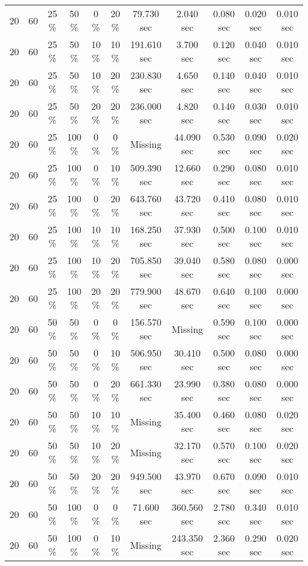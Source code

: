 \documentclass{article}
\begin{document}
\begin{longtable}[]{@{}ccccccccccc@{}}
20 & 60 & 25 \% & 50 \% & 0 \% & 20 \% & 79.730 sec & 2.040 sec & 0.080 sec & 0.020 sec & 0.010 sec \\
20 & 60 & 25 \% & 50 \% & 10 \% & 10 \% & 191.610 sec & 3.700 sec & 0.120 sec & 0.040 sec & 0.010 sec \\
20 & 60 & 25 \% & 50 \% & 10 \% & 20 \% & 230.830 sec & 4.650 sec & 0.140 sec & 0.040 sec & 0.010 sec \\
20 & 60 & 25 \% & 50 \% & 20 \% & 20 \% & 236.000 sec & 4.820 sec & 0.140 sec & 0.030 sec & 0.010 sec \\
20 & 60 & 25 \% & 100 \% & 0 \% & 0 \% & Missing & 44.090 sec & 0.530 sec & 0.090 sec & 0.020 sec \\
20 & 60 & 25 \% & 100 \% & 0 \% & 10 \% & 509.390 sec & 12.660 sec & 0.290 sec & 0.080 sec & 0.010 sec \\
20 & 60 & 25 \% & 100 \% & 0 \% & 20 \% & 643.760 sec & 43.720 sec & 0.410 sec & 0.080 sec & 0.010 sec \\
20 & 60 & 25 \% & 100 \% & 10 \% & 10 \% & 168.250 sec & 37.930 sec & 0.500 sec & 0.100 sec & 0.010 sec \\
20 & 60 & 25 \% & 100 \% & 10 \% & 20 \% & 705.850 sec & 39.040 sec & 0.580 sec & 0.080 sec & 0.000 sec \\
20 & 60 & 25 \% & 100 \% & 20 \% & 20 \% & 779.900 sec & 48.670 sec & 0.640 sec & 0.100 sec & 0.000 sec \\
20 & 60 & 50 \% & 50 \% & 0 \% & 0 \% & 156.570 sec & Missing & 0.590 sec & 0.100 sec & 0.000 sec \\
20 & 60 & 50 \% & 50 \% & 0 \% & 10 \% & 506.950 sec & 30.410 sec & 0.500 sec & 0.080 sec & 0.000 sec \\
20 & 60 & 50 \% & 50 \% & 0 \% & 20 \% & 661.330 sec & 23.990 sec & 0.380 sec & 0.080 sec & 0.000 sec \\
20 & 60 & 50 \% & 50 \% & 10 \% & 10 \% & Missing & 35.400 sec & 0.460 sec & 0.080 sec & 0.020 sec \\
20 & 60 & 50 \% & 50 \% & 10 \% & 20 \% & Missing & 32.170 sec & 0.570 sec & 0.100 sec & 0.020 sec \\
20 & 60 & 50 \% & 50 \% & 20 \% & 20 \% & 949.500 sec & 43.970 sec & 0.670 sec & 0.090 sec & 0.010 sec \\
20 & 60 & 50 \% & 100 \% & 0 \% & 0 \% & 71.600 sec & 360.560 sec & 2.780 sec & 0.340 sec & 0.010 sec \\
20 & 60 & 50 \% & 100 \% & 0 \% & 10 \% & Missing & 243.350 sec & 2.360 sec & 0.290 sec & 0.020 sec \\

\end{longtable}
\end{document}

